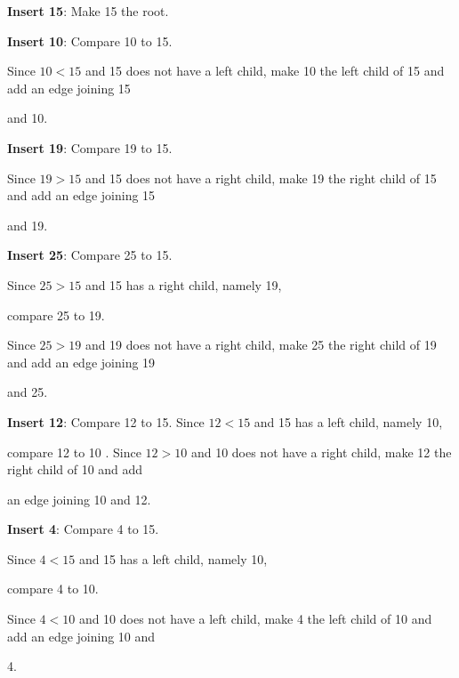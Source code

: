 \documentclass{report}
\begin{document}
\textbf{Insert 15}: Make 15 the root.
\vspace{3mm}

\textbf{Insert 10}: Compare 10 to 15.
\vspace{3mm}

Since $10<15$ and 15 does not have a left child, make 10 the left child of 15 and add an edge joining 15 

and 10.
\vspace{3mm}

\textbf{Insert 19}: Compare 19 to 15.
\vspace{3mm}

Since $19>15$ and 15 does not have a right child, make 19 the right child of 15 and add an edge joining 15 

and 19.
\vspace{3mm}

\textbf{Insert 25}: Compare 25 to 15.
\vspace{3mm}

Since $25>15$ and 15 has a right child, namely 19, 
\vspace{3mm}

compare 25 to 19.
\vspace{3mm}

Since $25>19$ and 19 does not have a right child, make 25 the right child of 19 and add an edge joining 19 

and 25.
\vspace{3mm}

\textbf{Insert 12}: Compare 12 to 15.
Since $12<15$ and 15 has a left child, namely 10, 
\vspace{3mm}

compare 12 to 10 .
Since $12>10$ and 10 does not have a right child, make 12 the right child of 10 and add 

an edge joining 10 and 12.
\vspace{3mm}

\textbf{Insert 4}: Compare 4 to 15.
\vspace{3mm}

Since $4<15$ and 15 has a left child, namely 10,
\vspace{3mm}

compare 4 to 10.
\vspace{3mm}

Since $4<10$ and 10 does not have a left child, make 4 the left child of 10 and add an edge joining 10 and 

4.
\bigbreak \noindent
\vspace{1.5mm}
\end{document}
